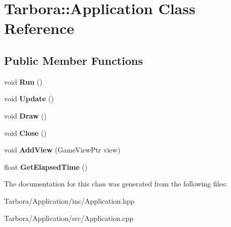 \hypertarget{classTarbora_1_1Application}{}\section{Tarbora\+:\+:Application Class Reference}
\label{classTarbora_1_1Application}
\subsection*{Public Member Functions}
\begin{DoxyCompactItemize}
\item 
\mbox{\label{classTarbora_1_1Application_a9f55222e851dbfeef7b594e44704f1d9}} 
void {\bfseries Run} ()
\item 
\mbox{\label{classTarbora_1_1Application_a92b619d30ed4d4b91b1de30fe768dd44}} 
void {\bfseries Update} ()
\item 
\mbox{\label{classTarbora_1_1Application_af0be99b67505b582127c5b52294658c5}} 
void {\bfseries Draw} ()
\item 
\mbox{\label{classTarbora_1_1Application_abe4792a90c2e190c74e0babd20931d1d}} 
void {\bfseries Close} ()
\item 
\mbox{\label{classTarbora_1_1Application_a7746a5bd5d3642d4c11a9c3c1f5c7506}} 
void {\bfseries Add\+View} (Game\+View\+Ptr view)
\item 
\mbox{\label{classTarbora_1_1Application_a510f6b85a2b745c28401ebb800d9b711}} 
float {\bfseries Get\+Elapsed\+Time} ()
\end{DoxyCompactItemize}


The documentation for this class was generated from the following files\+:\begin{DoxyCompactItemize}
\item 
Tarbora/\+Application/inc/Application.\+hpp\item 
Tarbora/\+Application/src/Application.\+cpp\end{DoxyCompactItemize}
